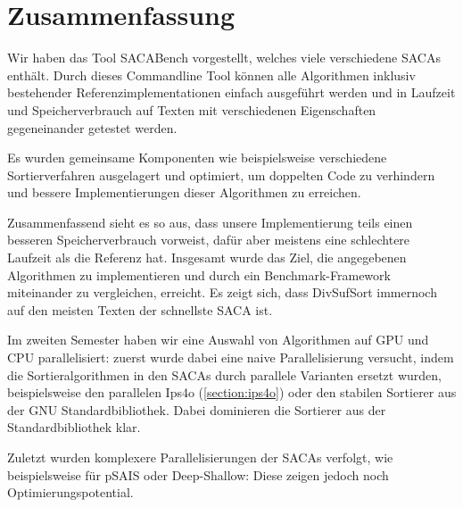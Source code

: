\section{Zusammenfassung}

Wir  haben das Tool SACABench vorgestellt, welches viele verschiedene SACAs enthält.
Durch dieses Commandline Tool können alle Algorithmen inklusiv bestehender Referenzimplementationen einfach ausgeführt werden
und in Laufzeit und Speicherverbrauch auf Texten mit verschiedenen Eigenschaften gegeneinander getestet werden.

Es wurden gemeinsame Komponenten wie beispielsweise verschiedene Sortierverfahren ausgelagert und optimiert,
um doppelten Code zu verhindern und bessere Implementierungen dieser Algorithmen zu erreichen.

Zusammenfassend sieht es so aus, dass unsere Implementierung teils einen besseren Speicherverbrauch vorweist,
dafür aber meistens eine schlechtere Laufzeit als die Referenz hat.
Insgesamt wurde das Ziel, die angegebenen Algorithmen zu implementieren und
durch ein Benchmark-Framework miteinander zu vergleichen, erreicht.
Es zeigt sich, dass DivSufSort immernoch auf den meisten Texten der schnellste SACA ist.

Im zweiten Semester haben wir eine Auswahl von Algorithmen auf GPU und CPU parallelisiert:
zuerst wurde dabei eine naive Parallelisierung versucht, indem die Sortieralgorithmen in den SACAs durch
parallele Varianten ersetzt wurden, beispielsweise den parallelen Ips4o (\cref{section:ips4o}) oder
den stabilen Sortierer aus der GNU Standardbibliothek.
Dabei dominieren die Sortierer aus der Standardbibliothek klar.

Zuletzt wurden komplexere Parallelisierungen der SACAs verfolgt, wie beispielsweise für pSAIS
oder Deep-Shallow: 
Diese zeigen jedoch noch Optimierungspotential.